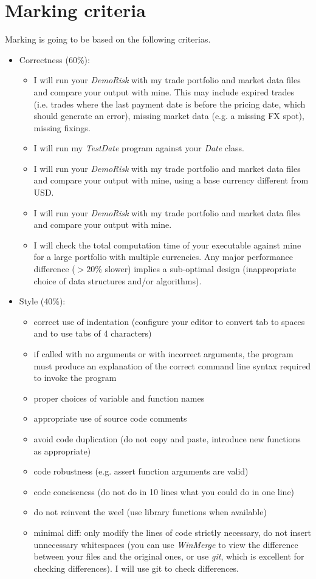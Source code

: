 \documentclass[10pt]{article}
\begin{document}
\section{Marking criteria}
Marking is going to be based on the following criterias.
\begin{itemize}
\item Correctness (60\%):
\begin{itemize}
\item I will run your \textit{DemoRisk} with my trade portfolio and market data files and compare your output with mine. This may include expired trades (i.e. trades where the last payment date is before the pricing date, which should generate an error), missing market data (e.g. a missing FX spot), missing fixings.
\item I will run my \textit{TestDate} program against your \textit{Date} class.
\item I will run your \textit{DemoRisk} with my trade portfolio and market data files and compare your output with mine, using a base currency different from USD.
\item I will run your \textit{DemoRisk} with my trade portfolio and market data files and compare your output with mine.
\item I will check the total computation time of your executable against mine for a large portfolio with multiple currencies.
Any major performance difference ($>20\%$ slower) implies a sub-optimal design (inappropriate choice of data structures and/or algorithms).
\end{itemize}
\item Style (40\%):
\begin{itemize}
\item correct use of indentation (configure your editor to convert tab to spaces and to use tabs of 4 characters)
\item if called with no arguments or with incorrect arguments, the program must produce an explanation of the correct command line syntax required to invoke the program
\item proper choices of variable and function names
\item appropriate use of source code comments
\item avoid code duplication (do not copy and paste, introduce new functions as appropriate)
\item code robustness (e.g. assert function arguments are valid)
\item code conciseness (do not do in 10 lines what you could do in one line)
\item do not reinvent the weel (use library functions when available)
\item minimal diff: only modify the lines of code strictly necessary, do not insert unnecessary whitespaces (you can use \textit{WinMerge} to view the difference between your files and the original ones, or use \textit{git}, which is excellent for checking differences). I will use git to check differences.
\end{itemize}
\end{itemize}
\end{document}
